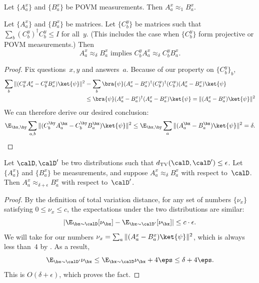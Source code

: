 \documentclass[11pt]{article}
\begin{document}
\begin{fact}\label{fact:trivial-upper-bound-approx-delta}
Let $\{A^x_a\}$ and $\{B^x_a\}$ be POVM measurements.
Then $A^x_a \approx_1 B^x_a$.
\end{fact}

\begin{fact}\label{fact:add-a-proj}
Let $\{A_a^{x}\}$ and $\{B_a^{x}\}$ be matrices.
Let $\{C_b^{y}\}$ be matrices such that $\sum_b (C_b^y)^\dagger C_b^y \leq I$ for all~$y$.
(This includes the case when $\{C_b^y\}$ form projective or POVM measurements.) Then
\begin{equation*}
\text{$A_a^{x} \approx_{\delta} B_a^x$ implies $C_b^y A_a^x \approx_{\delta} C_b^y B_a^x$.}
\end{equation*}
\end{fact}
\begin{proof}
Fix questions~$x, y$ and answers~$a$. Because of our property on $\{C_b^y\}_b$,
\begin{align*}
\sum_{b} \Vert (C_b^{y} A_a^{x} - C_b^{y} B_a^{x})\ket{\psi}\Vert^2
&= \sum_{b} \bra{\psi} (A_a^x - B_a^x)^\dagger (C_b^y)^\dagger (C_b^y) (A_a^{x} -  B_a^{x})\ket{\psi}\\
&\leq \bra{\psi} (A_a^x - B_a^x)^\dagger (A_a^x - B_a^x) \ket{\psi}
 = \Vert (A_a^{x} -B_a^{x})\ket{\psi}\Vert^2
\end{align*}
We can therefore derive our desired conclusion:
\begin{equation*}
\E_{\bx, \by} \sum_{a, b} \Vert (C_b^{\by} A_a^{\bx} - C_b^{\by} B_a^{\bx}) \ket{\psi} \Vert^2
\leq \E_{\bx, \by} \sum_{a} \Vert (A_a^{\bx} - B_a^{\bx}) \ket{\psi} \Vert^2
= \delta.\qedhere
\end{equation*}
\end{proof}

\begin{fact}\label{fact:swap-dists}
Let $\calD, \calD'$ be two distributions such that $d_{\mathrm{TV}}(\calD, \calD') \leq \epsilon$.
Let $\{A_a^x\}$ and $\{B_a^x\}$ be measurements,
and suppose $A_a^x \approx_\delta B_a^x$ with respect to~$\calD$. Then $A_a^x \approx_{\delta + \epsilon} B_a^x$ with respect to~$\calD'$.
\end{fact}
\begin{proof}
By the definition of total variation distance,
for any set of numbers $\{\nu_x\}$ satisfying $0 \leq \nu_x \leq c$,
the expectations under the two distributions are similar:
\begin{equation*}
|\E_{\bx \sim \calD} [\nu_\bx] - \E_{\bx \sim \calD'}[\nu_{\bx}]| \leq c \cdot \epsilon.
\end{equation*}
We will take for our numbers $\nu_x = \sum_a \Vert (A_{a}^{x} - B_{a}^{x} ) \ket{\psi}\Vert^2$,
which is always less than~$4$ by .
As a result,
\begin{equation*}
\E_{\bx \sim \calD'} \nu_{\bx} \leq \E_{\bx \sim \calD} \nu_{\bx} + 4 \eps \leq \delta + 4 \eps.
\end{equation*}
This is $O(\delta + \epsilon)$, which proves the fact.
\end{proof}
\end{document}
